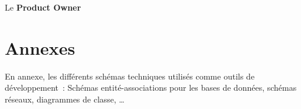 \documentclass{report}
\begin{document}

		Le \textbf{Product Owner}

\chapter{Annexes} %
	

	En annexe, les différents schémas techniques utilisés comme outils de développement : Schémas entité-associations pour les bases de données, schémas réseaux, diagrammes de classe, …
\end{document}
